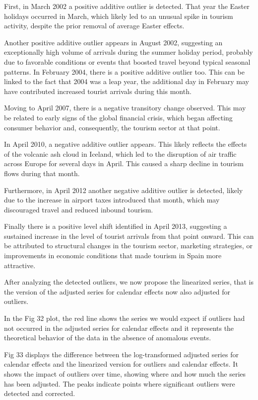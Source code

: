 \documentclass[
]{article}
\begin{document}
First, in March 2002 a positive additive outlier is detected. That year
the Easter holidays occurred in March, which likely led to an unusual
spike in tourism activity, despite the prior removal of average Easter
effects.

Another positive additive outlier appears in August 2002, suggesting an
exceptionally high volume of arrivals during the summer holiday period,
probably due to favorable conditions or events that boosted travel
beyond typical seasonal patterns. In February 2004, there is a positive
additive outlier too. This can be linked to the fact that 2004 was a
leap year, the additional day in February may have contributed increased
tourist arrivals during this month.

Moving to April 2007, there is a negative transitory change observed.
This may be related to early signs of the global financial crisis, which
began affecting consumer behavior and, consequently, the tourism sector
at that point.

In April 2010, a negative additive outlier appears. This likely reflects
the effects of the volcanic ash cloud in Iceland, which led to the
disruption of air traffic across Europe for several days in April. This
caused a sharp decline in tourism flows during that month.

Furthermore, in April 2012 another negative additive outlier is
detected, likely due to the increase in airport taxes introduced that
month, which may discouraged travel and reduced inbound tourism.

Finally there is a positive level shift identified in April 2013,
suggesting a sustained increase in the level of tourist arrivals from
that point onward. This can be attributed to structural changes in the
tourism sector, marketing strategies, or improvements in economic
conditions that made tourism in Spain more attractive.

After analyzing the detected outliers, we now propose the linearized
series, that is the version of the adjusted series for calendar effects
now also adjusted for outliers.

In the Fig 32 plot, the red line shows the series we would expect if
outliers had not occurred in the adjusted series for calendar effects
and it represents the theoretical behavior of the data in the absence of
anomalous events.

Fig 33 displays the difference between the log-transformed adjusted
series for calendar effects and the linearized version for outliers and
calendar effects. It shows the impact of outliers over time, showing
where and how much the series has been adjusted. The peaks indicate
points where significant outliers were detected and corrected.
\end{document}

